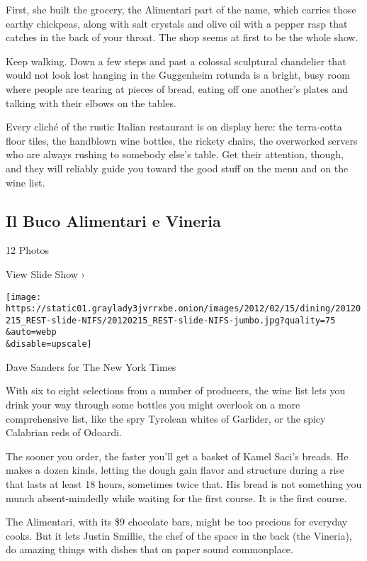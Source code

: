 First, she built the grocery, the Alimentari part of the name, which
carries those earthy chickpeas, along with salt crystals and olive oil
with a pepper rasp that catches in the back of your throat. The shop
seems at first to be the whole show.

Keep walking. Down a few steps and past a colossal sculptural chandelier
that would not look lost hanging in the Guggenheim rotunda is a bright,
busy room where people are tearing at pieces of bread, eating off one
another's plates and talking with their elbows on the tables.

Every cliché of the rustic Italian restaurant is on display here: the
terra-cotta floor tiles, the handblown wine bottles, the rickety chairs,
the overworked servers who are always rushing to somebody else's table.
Get their attention, though, and they will reliably guide you toward the
good stuff on the menu and on the wine list.

\href{https://www.nytimes3xbfgragh.onion/slideshow/2012/02/15/dining/20120215_REST.html}{}

\hypertarget{il-buco-alimentari-e-vineria}{%
\subsection{Il Buco Alimentari e
Vineria}\label{il-buco-alimentari-e-vineria}}

12 Photos

View Slide Show ›

\texttt{[image: https://static01.graylady3jvrrxbe.onion/images/2012/02/15/dining/20120215\_REST-slide-NIFS/20120215\_REST-slide-NIFS-jumbo.jpg?quality=75\\\&auto=webp\\\&disable=upscale]}

Dave Sanders for The New York Times

With six to eight selections from a number of producers, the wine list
lets you drink your way through some bottles you might overlook on a
more comprehensive list, like the spry Tyrolean whites of Garlider, or
the spicy Calabrian reds of Odoardi.

The sooner you order, the faster you'll get a basket of Kamel Saci's
breads. He makes a dozen kinds, letting the dough gain flavor and
structure during a rise that lasts at least 18 hours, sometimes twice
that. His bread is not something you munch absent-mindedly while waiting
for the first course. It is the first course.

The Alimentari, with its \$9 chocolate bars, might be too precious for
everyday cooks. But it lets Justin Smillie, the chef of the space in the
back (the Vineria), do amazing things with dishes that on paper sound
commonplace.

